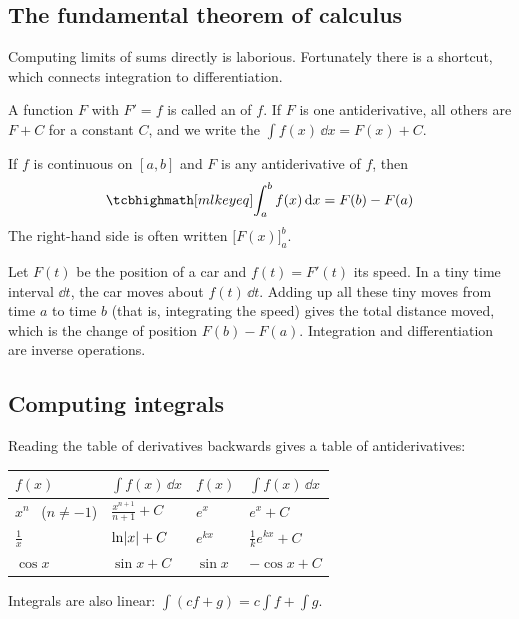 \subsection{The fundamental theorem of calculus}

Computing limits of sums directly is laborious. Fortunately there is a
shortcut, which connects integration to differentiation.

\begin{definition}[Antiderivative]\label{def:antiderivative}
A function $F$ with $F' = f$ is called an  of $f$. If $F$
is one antiderivative, all others are $F + C$ for a constant $C$, and we write
the  $\int f(x)\,\dd x = F(x) + C$.
\end{definition}

\begin{theorem}\label{thm:ftc}
If $f$ is continuous on $[a, b]$ and $F$ is any antiderivative of $f$, then
\[
  \keyeq{\int_a^b f(x)\,\dd x = F(b) - F(a)}
\]
The right-hand side is often written $\bigl[F(x)\bigr]_a^b$.
\end{theorem}

\begin{intuition}
Let $F(t)$ be the position of a car and $f(t) = F'(t)$ its speed. In a tiny
time interval $\dd t$, the car moves about $f(t)\,\dd t$. Adding up all these
tiny moves from time $a$ to time $b$ (that is, integrating the speed) gives the
total distance moved, which is the change of position $F(b) - F(a)$. Integration
and differentiation are inverse operations.
\end{intuition}

\subsection{Computing integrals}

Reading the table of derivatives backwards gives a table of antiderivatives:
\begin{center}
\renewcommand{\arraystretch}{1.4}
\begin{tabular}{@{}ll@{\qquad}ll@{}}
\toprule
$f(x)$ & $\int f(x)\,\dd x$ & $f(x)$ & $\int f(x)\,\dd x$\\
\midrule
$x^n$ \ ($n \neq -1$) & $\frac{x^{n+1}}{n+1} + C$ & $e^x$ & $e^x + C$\\
$\frac1x$ & $\ln\lvert x\rvert + C$ & $e^{kx}$ & $\frac1k e^{kx} + C$\\
$\cos x$ & $\sin x + C$ & $\sin x$ & $-\cos x + C$\\
\bottomrule
\end{tabular}
\end{center}
Integrals are also linear: $\int(cf + g) = c\int f + \int g$.

